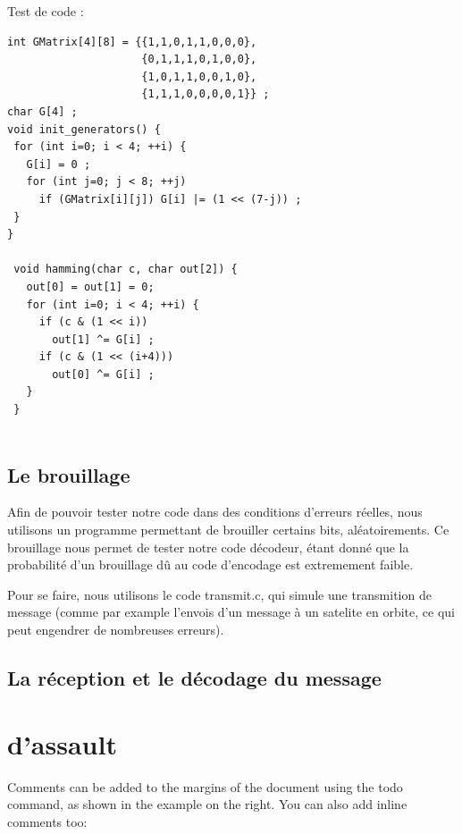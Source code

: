 Test de code :

\begin{verbatim}
int GMatrix[4][8] = {{1,1,0,1,1,0,0,0},
                     {0,1,1,1,0,1,0,0},
                     {1,0,1,1,0,0,1,0},
                     {1,1,1,0,0,0,0,1}} ;
char G[4] ;
void init_generators() {
 for (int i=0; i < 4; ++i) {
   G[i] = 0 ;
   for (int j=0; j < 8; ++j)
     if (GMatrix[i][j]) G[i] |= (1 << (7-j)) ;
 }
}

 void hamming(char c, char out[2]) {
   out[0] = out[1] = 0;
   for (int i=0; i < 4; ++i) {
     if (c & (1 << i))
       out[1] ^= G[i] ;
     if (c & (1 << (i+4)))
       out[0] ^= G[i] ;
   }
 }


\end{verbatim}



\subsection{Le brouillage}
\label{sub:brouillage}

Afin de pouvoir tester notre code dans des conditions d'erreurs réelles, nous utilisons un programme permettant de brouiller certains bits, aléatoirements. Ce brouillage nous permet de tester notre code décodeur, étant donné que la probabilité d'un brouillage dû au code d'encodage est extremement faible.

Pour se faire, nous utilisons le code transmit.c, qui simule une transmition de message (comme par example l'envois d'un message à un satelite en orbite, ce qui peut engendrer de nombreuses erreurs).



\subsection{La réception et le décodage du message}
\label{sub:La réception et le décodage du message}



\section{d'assault}
\label{sec:assault}


Comments can be added to the margins of the document using the  todo command, as shown in the example on the right. You can also add inline comments too:


